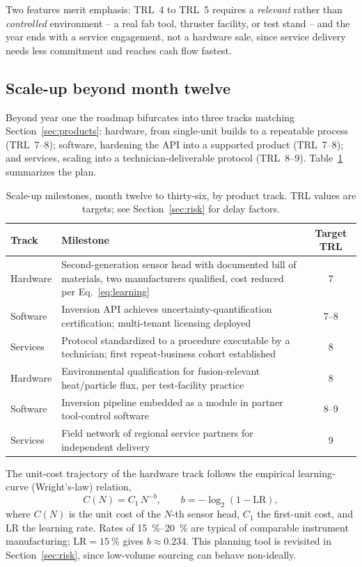 Two features merit emphasis: TRL~4 to TRL~5 requires a \emph{relevant} rather than \emph{controlled} environment -- a real fab tool, thruster facility, or test stand -- and the year ends with a service engagement, not a hardware sale, since service delivery needs less commitment and reaches cash flow fastest.

\subsection{Scale-up beyond month twelve}

Beyond year one the roadmap bifurcates into three tracks matching Section~\ref{sec:products}: hardware, from single-unit builds to a repeatable process (TRL~7--8); software, hardening the API into a supported product (TRL~7--8); and services, scaling into a technician-deliverable protocol (TRL~8--9). Table~\ref{tab:scaleup} summarizes the plan.

\begin{table}[htbp]
\centering
\caption{Scale-up milestones, month twelve to thirty-six, by product track. TRL values are targets; see Section~\ref{sec:risk} for delay factors.}
\label{tab:scaleup}
\begin{tabularx}{\textwidth}{@{}l X c@{}}
\toprule
Track & Milestone & Target TRL \\
\midrule
Hardware & Second-generation sensor head with documented bill of materials, two manufacturers qualified, cost reduced per Eq.~\eqref{eq:learning} & 7 \\
Software & Inversion API achieves uncertainty-quantification certification; multi-tenant licensing deployed & 7--8 \\
Services & Protocol standardized to a procedure executable by a technician; first repeat-business cohort established & 8 \\
Hardware & Environmental qualification for fusion-relevant heat/particle flux, per test-facility practice \cite{ref0581,ref0586} & 8 \\
Software & Inversion pipeline embedded as a module in partner tool-control software & 8--9 \\
Services & Field network of regional service partners for independent delivery & 9 \\
\bottomrule
\end{tabularx}
\end{table}

The unit-cost trajectory of the hardware track follows the empirical learning-curve (Wright's-law) relation,
\begin{equation}
C(N) = C_{1}\, N^{-b}, \qquad b = -\log_{2}(1 - \mathrm{LR}),
\label{eq:learning}
\end{equation}
where $C(N)$ is the unit cost of the $N$-th sensor head, $C_{1}$ the first-unit cost, and $\mathrm{LR}$ the learning rate. Rates of \SI{15}{\percent}--\SI{20}{\percent} are typical of comparable instrument manufacturing; $\mathrm{LR} = \SI{15}{\percent}$ gives $b \approx 0.234$. This planning tool is revisited in Section~\ref{sec:risk}, since low-volume sourcing can behave non-ideally.

